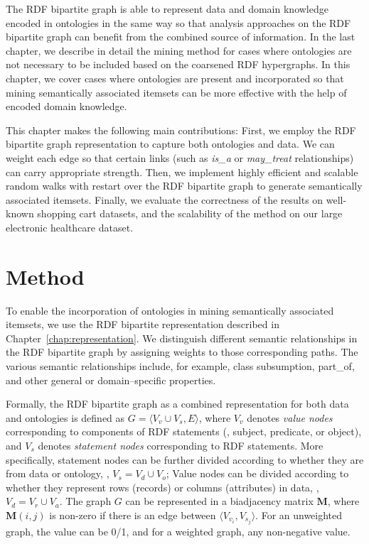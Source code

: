 The RDF bipartite graph is able to represent data and domain knowledge encoded in ontologies in the same way so that analysis approaches on the RDF bipartite graph can benefit from the combined source of information. In the last chapter, we describe in detail the mining method for cases where ontologies are not necessary to be included based on the coarsened RDF hypergraphs. In this chapter, we cover cases where ontologies are present and incorporated so that mining semantically associated itemsets can be more effective with the help of encoded domain knowledge.

This chapter makes the following main contributions:  First, we employ the RDF bipartite graph representation to capture both ontologies and data. We can weight each edge so that certain links (such as \emph{is\_a} or \emph{may\_treat} relationships) can carry appropriate strength.  Then, we implement highly efficient and scalable random walks with restart over the RDF bipartite graph to generate semantically associated itemsets. Finally, we evaluate the correctness of the results on well-known shopping cart datasets, and the scalability of the method on our large electronic healthcare dataset.
\section{Method}

To enable the incorporation of ontologies in mining semantically associated itemsets, we use the RDF bipartite representation described in Chapter~\ref{chap:representation}. We distinguish different semantic relationships in the RDF bipartite graph by assigning weights to those corresponding paths. The various semantic relationships include, for example,  class subsumption, part\_of, and other general or domain--specific properties.

Formally, the RDF bipartite graph as a combined representation for both data and ontologies is defined as $G=\langle V_v \cup V_s, E \rangle$, where $V_v$ denotes \emph{value nodes} corresponding to components of RDF statements (\ie, subject, predicate, or object), and $V_s$ denotes \emph{statement nodes} corresponding to RDF statements. More specifically, statement nodes can be further divided according to whether they are from data or ontology, \ie, $V_s=V_d \cup V_o$; Value nodes can be divided according to whether they represent rows (records) or columns (attributes) in data, \ie, $V_d=V_r \cup V_a$. The graph $G$ can be represented in a biadjacency matrix $\mathbf{M}$, where $\mathbf{M}(i,j)$ is non-zero if there is an edge between $\langle V_{v_i}, V_{s_j} \rangle$. For an unweighted graph, the value can be 0/1, and for a weighted graph, any non-negative value.

